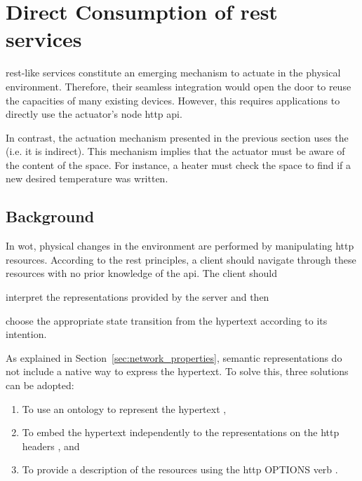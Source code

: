 
\section{Direct Consumption of \acs{rest} services}

\ac{rest}-like services constitute an emerging mechanism to actuate in the physical environment. %
Therefore, their seamless integration would open the door to reuse the capacities of many existing devices. %
However, this requires applications to directly use the actuator's node \ac{http} \ac{api}.


In contrast, the actuation mechanism presented in the previous section uses the \Space{} (i.e. it is indirect).
This mechanism implies that the actuator must be aware of the content of the space.
For instance, a heater must check the space to find if a new desired temperature was written.


\subsection{Background}
\label{sec:background_restdesc}

In \ac{wot}, physical changes in the environment are performed by manipulating \ac{http} resources.
According to the \ac{rest} principles, a client should navigate through these resources with no prior knowledge of the \ac{api}.
The client should 
\begin{enumerate*}[label=\itshape(\arabic*\upshape)]
  \item interpret the representations provided by the server and then
  \item choose the appropriate state transition from the hypertext according to its intention. %
\end{enumerate*}


As explained in Section~\ref{sec:network_properties}, semantic representations do not include a native way to express the hypertext. %
To solve this, three solutions can be adopted:
\begin{enumerate}
  \item To use an ontology to represent the hypertext \citep{kjernsmo_necessity_2012},
  \item To embed the hypertext independently to the representations on the \ac{http} headers \citep{mark_web_2010}, and
  \item To provide a description of the resources using the \ac{http} OPTIONS verb \citep{verborgh_functional_2012,verborgh_ijcs_2014}.
\end{enumerate}


